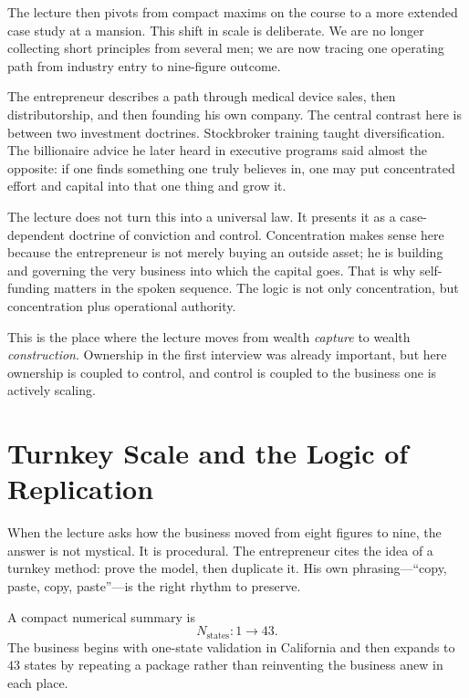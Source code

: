 The lecture then pivots from compact maxims on the course to a more extended case study at a mansion. This shift in scale is deliberate. We are no longer collecting short principles from several men; we are now tracing one operating path from industry entry to nine-figure outcome.

The entrepreneur describes a path through medical device sales, then distributorship, and then founding his own company. The central contrast here is between two investment doctrines. Stockbroker training taught diversification. The billionaire advice he later heard in executive programs said almost the opposite: if one finds something one truly believes in, one may put concentrated effort and capital into that one thing and grow it.

The lecture does not turn this into a universal law. It presents it as a case-dependent doctrine of conviction and control. Concentration makes sense here because the entrepreneur is not merely buying an outside asset; he is building and governing the very business into which the capital goes. That is why self-funding matters in the spoken sequence. The logic is not only concentration, but concentration plus operational authority.

This is the place where the lecture moves from wealth \emph{capture} to wealth \emph{construction}. Ownership in the first interview was already important, but here ownership is coupled to control, and control is coupled to the business one is actively scaling.

\section{Turnkey Scale and the Logic of Replication}

When the lecture asks how the business moved from eight figures to nine, the answer is not mystical. It is procedural. The entrepreneur cites the idea of a turnkey method: prove the model, then duplicate it. His own phrasing---``copy, paste, copy, paste''---is the right rhythm to preserve.

A compact numerical summary is
\begin{equation}
N_{\mathrm{states}} : 1 \rightarrow 43.
\end{equation}
The business begins with one-state validation in California and then expands to $43$ states by repeating a package rather than reinventing the business anew in each place.

